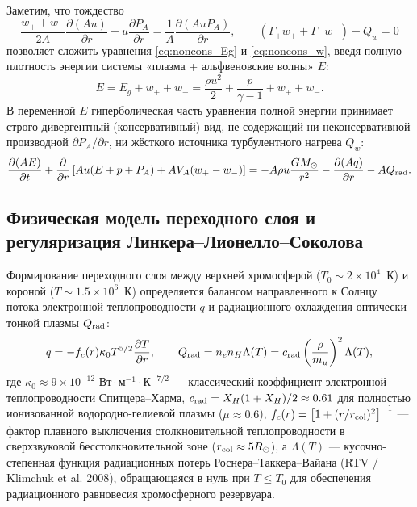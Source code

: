 \documentclass[11pt,a4paper]{article}
\begin{document}
Заметим, что тождество
\[
\frac{w_+ + w_-}{2A}\frac{\partial(Au)}{\partial r} + u\frac{\partial P_A}{\partial r} = \frac{1}{A}\frac{\partial(A u P_A)}{\partial r}, \qquad (\Gamma_+ w_+ + \Gamma_- w_-) - Q_w = 0
\]
позволяет сложить уравнения \eqref{eq:noncons_Eg} и \eqref{eq:noncons_w}, введя полную плотность энергии системы «плазма + альфвеновские волны» $E$:
\begin{equation}
E = E_g + w_+ + w_- = \frac{\rho u^2}{2} + \frac{p}{\gamma-1} + w_+ + w_-.
\label{eq:total_energy_def}
\end{equation}
В переменной $E$ гиперболическая часть уравнения полной энергии принимает строго дивергентный (консервативный) вид, не содержащий ни неконсервативной производной $\partial P_A/\partial r$, ни жёсткого источника турбулентного нагрева $Q_w$:
\begin{equation}
\frac{\partial(A E)}{\partial t} + \frac{\partial}{\partial r}\left[A u(E + p + P_A) + A V_A(w_+ - w_-)\right] = -A\rho u\frac{GM_\odot}{r^2} - \frac{\partial(A q)}{\partial r} - A Q_{\rm rad}.
\label{eq:total_energy_eq_1d}
\end{equation}

\subsection{Физическая модель переходного слоя и регуляризация Линкера--Лионелло--Соколова}

Формирование переходного слоя между верхней хромосферой ($T_0 \sim 2\times 10^4$~К) и короной ($T \sim 1.5\times 10^6$~К) определяется балансом направленного к Солнцу потока электронной теплопроводности $q$ и радиационного охлаждения оптически тонкой плазмы $Q_{\rm rad}$:
\begin{equation}
q = -f_c(r)\kappa_0 T^{5/2}\frac{\partial T}{\partial r}, \qquad Q_{\rm rad} = n_e n_H \Lambda(T) = c_{\rm rad}\left(\frac{\rho}{m_u}\right)^2\Lambda(T),
\label{eq:tr_physics_raw}
\end{equation}
где $\kappa_0 \approx 9\times 10^{-12}\text{ Вт}\cdot\text{м}^{-1}\cdot\text{К}^{-7/2}$ --- классический коэффициент электронной теплопроводности Спитцера--Харма, $c_{\rm rad} = X_H(1 + X_H)/2 \approx 0.61$ для полностью ионизованной водородно-гелиевой плазмы ($\mu \approx 0.6$), $f_c(r) = \left[1 + (r/r_{\rm col})^2\right]^{-1}$ --- фактор плавного выключения столкновительной теплопроводности в сверхзвуковой бесстолкновительной зоне ($r_{\rm col} \approx 5 R_\odot$), а $\Lambda(T)$ --- кусочно-степенная функция радиационных потерь Роснера--Таккера--Вайана (RTV / Klimchuk et al. 2008), обращающаяся в нуль при $T \le T_0$ для обеспечения радиационного равновесия хромосферного резервуара.
\end{document}
